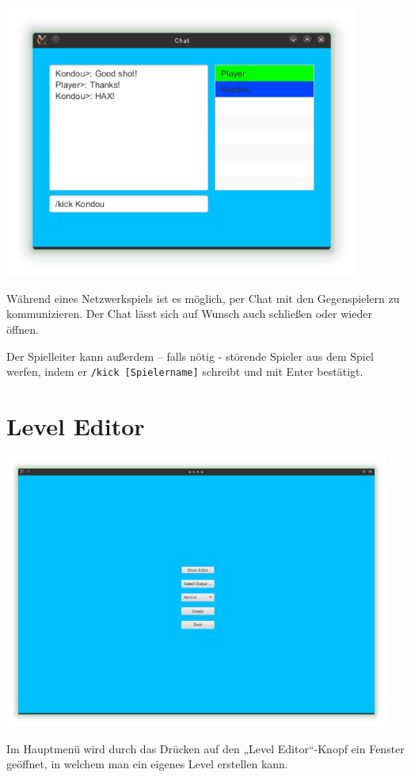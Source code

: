 \documentclass{scrreprt}
\begin{document}
\includegraphics[height=9cm]{Screenshot12.png}

Während eines Netzwerkspiels ist es möglich, per Chat mit den Gegenspielern zu kommunizieren. Der Chat lässt sich auf Wunsch auch schließen oder wieder öffnen.

Der Spielleiter kann außerdem – falls nötig - störende Spieler aus dem Spiel werfen, indem er \texttt{/kick [Spielername]} schreibt und mit Enter
bestätigt.

\chapter{Level Editor}

\includegraphics[height=9cm]{Screenshot3.png}

Im Hauptmenü wird durch das Drücken auf den „Level Editor“-Knopf ein Fenster geöffnet, in welchem man ein eigenes Level erstellen kann.
\end{document}
